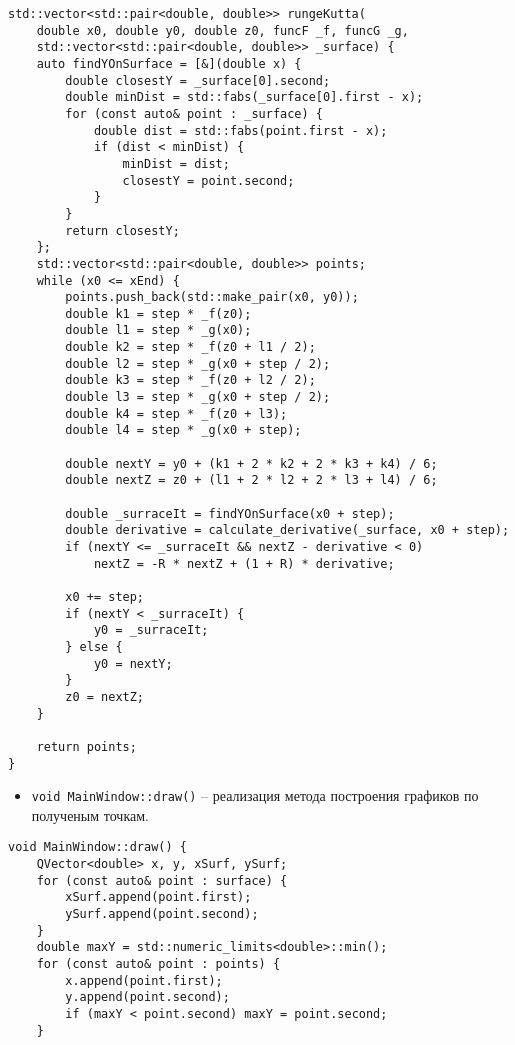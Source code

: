 \begin{enumerate}
\begin{lstlisting}
std::vector<std::pair<double, double>> rungeKutta(
    double x0, double y0, double z0, funcF _f, funcG _g,
    std::vector<std::pair<double, double>> _surface) {
    auto findYOnSurface = [&](double x) {
        double closestY = _surface[0].second;
        double minDist = std::fabs(_surface[0].first - x);
        for (const auto& point : _surface) {
            double dist = std::fabs(point.first - x);
            if (dist < minDist) {
                minDist = dist;
                closestY = point.second;
            }
        }
        return closestY;
    };
    std::vector<std::pair<double, double>> points;
    while (x0 <= xEnd) {
        points.push_back(std::make_pair(x0, y0));
        double k1 = step * _f(z0);
        double l1 = step * _g(x0);
        double k2 = step * _f(z0 + l1 / 2);
        double l2 = step * _g(x0 + step / 2);
        double k3 = step * _f(z0 + l2 / 2);
        double l3 = step * _g(x0 + step / 2);
        double k4 = step * _f(z0 + l3);
        double l4 = step * _g(x0 + step);

        double nextY = y0 + (k1 + 2 * k2 + 2 * k3 + k4) / 6;
        double nextZ = z0 + (l1 + 2 * l2 + 2 * l3 + l4) / 6;

        double _surraceIt = findYOnSurface(x0 + step);
        double derivative = calculate_derivative(_surface, x0 + step);
        if (nextY <= _surraceIt && nextZ - derivative < 0)
            nextZ = -R * nextZ + (1 + R) * derivative;

        x0 += step;
        if (nextY < _surraceIt) {
            y0 = _surraceIt;
        } else {
            y0 = nextY;
        }
        z0 = nextZ;
    }

    return points;
}
\end{lstlisting}

\begin{itemize}
\item \lstinline`void MainWindow::draw()` -- реализация метода построения графиков по полученым точкам.
\end{itemize}

\begin{lstlisting}
void MainWindow::draw() {
    QVector<double> x, y, xSurf, ySurf;
    for (const auto& point : surface) {
        xSurf.append(point.first);
        ySurf.append(point.second);
    }
    double maxY = std::numeric_limits<double>::min();
    for (const auto& point : points) {
        x.append(point.first);
        y.append(point.second);
        if (maxY < point.second) maxY = point.second;
    }


\end{lstlisting}
\end{enumerate}
